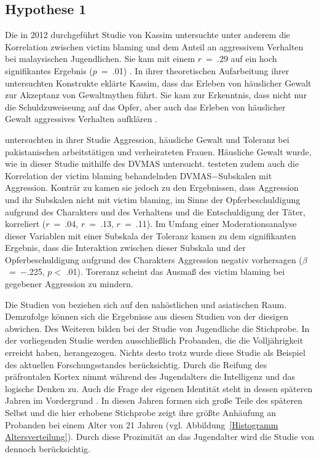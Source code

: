 \subsection{Hypothese 1}  \label{subsec_2.2.1}
Die in 2012 durchgeführt Studie von Kassim untersuchte unter anderem die Korrelation zwischen victim blaming und dem Anteil an aggressivem Verhalten bei malaysischen Jugendlichen. Sie kam mit einem $r$~=~.29 auf ein hoch signifikantes Ergebnis ($p$~=~.01) \parencite{H1_malasia_2012}. In ihrer theoretischen Aufarbeitung ihrer untersuchten Konstrukte eklärte Kassim, dass das Erleben von häuslicher Gewalt zur Akzeptanz von Gewaltmythen führt. Sie kam zur Erkenntnis, dass nicht nur die Schuldzuweiseung auf das Opfer, aber auch das Erleben von häuslicher Gewalt aggressives Verhalten aufklären \parencite{H1_malasia_2012}.

\textcite{H1_moderation_2020} untersuchten in ihrer Studie Aggression, häusliche Gewalt und Toleranz bei pakistanischen arbeitstätigen und verheirateten Frauen. Häusliche Gewalt wurde, wie in dieser Studie mithilfe des DVMAS untersucht. \textcite{H1_moderation_2020} testeten zudem auch die Korrelation der victim blaming behandelnden DVMAS$-$Subskalen mit Aggression. Konträr zu \textcite{H1_malasia_2012} kamen sie jedoch zu den Ergebnissen, dass Aggression und ihr Subskalen nicht mit victim blaming, im Sinne der Opferbeschuldigung aufgrund des Charakters und des Verhaltens und die Entschuldigung der Täter, korreliert ($r$~=~.04, $r$~=~.13, $r$~=~.11). Im Umfang einer Moderationsanalyse dieser Variablen mit einer Subskala der Toleranz kamen \textcite{H1_moderation_2020} zu dem signifikanten Ergebnis, dass die Interaktion zwischen dieser Subskala und der Opferbeschuldigung aufgrund des Charakters Aggression negativ vorhersagen ($\beta$~=~$-$.225, $p<$ .01). Toreranz scheint das Ausmaß des victim blaming bei gegebener Aggression zu mindern.

Die Studien von \textcite{H1_malasia_2012, H1_moderation_2020} beziehen sich auf den nahöstlichen und asiatischen Raum. Demzufolge können sich die Ergebnisse aus diesen Studien von der diesigen abwichen. Des Weiteren bilden bei der Studie von \textcite{H1_malasia_2012} Jugendliche die Stichprobe. In der vorliegenden Studie werden ausschließlich Probanden, die die Volljährigkeit erreicht haben, herangezogen. Nichts desto trotz wurde diese Studie als Beispiel des aktuellen Forschungsstandes berücksichtig. Durch die Reifung des präfrontalen Kortex nimmt während des Jugendalters die Intelligenz und das logische Denken zu. Auch die Frage der eigenen Identität steht in dessen späteren Jahren im Vordergrund \parencite{H1_Entwicklung}. In diesen Jahren formen sich große Teile des späteren Selbst und die hier erhobene Stichprobe zeigt ihre größte Anhäufung an Probanden bei einem Alter von 21 Jahren (vgl. Abbildung~\ref{Histogramm Altersverteilung}). Durch diese Prozimität an das Jugendalter wird die Studie von \textcite{H1_malasia_2012} dennoch berücksichtig.

